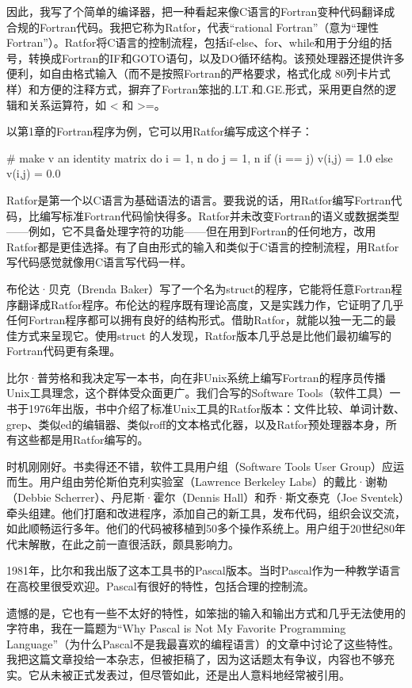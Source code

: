 \documentclass[a4paper,12pt,UTF8,twoside]{ctexbook}
\begin{document}
{因此，我写了个简单的编译器，把一种看起来像C语言的Fortran变种代码翻译成合规的Fortran代码。我把它称为Ratfor，代表“rational Fortran”（意为“理性Fortran”）。Ratfor将C语言的控制流程，包括if-else、for、while和用于分组的括号，转换成Fortran的IF和GOTO语句，以及DO循环结构。该预处理器还提供许多便利，如自由格式输入（而不是按照Fortran的严格要求，格式化成 80列卡片式样）和方便的注释方式，摒弃了Fortran笨拙的.LT.和.GE.形式，采用更自然的逻辑和关系运算符，如 < 和 >=。

以第1章的Fortran程序为例，它可以用Ratfor编写成这个样子：

# make v an identity matrix do i = 1, n do j = 1, n if (i == j) v(i,j) = 1.0 else v(i,j) = 0.0

Ratfor是第一个以C语言为基础语法的语言。要我说的话，用Ratfor编写Fortran代码，比编写标准Fortran代码愉快得多。Ratfor并未改变Fortran的语义或数据类型——例如，它不具备处理字符的功能——但在用到Fortran的任何地方，改用Ratfor都是更佳选择。有了自由形式的输入和类似于C语言的控制流程，用Ratfor写代码感觉就像用C语言写代码一样。

布伦达·贝克（Brenda Baker）写了一个名为struct的程序，它能将任意Fortran程序翻译成Ratfor程序。布伦达的程序既有理论高度，又是实践力作，它证明了几乎任何Fortran程序都可以拥有良好的结构形式。借助Ratfor，就能以独一无二的最佳方式来呈现它。使用struct 的人发现，Ratfor版本几乎总是比他们最初编写的Fortran代码更有条理。

比尔·普劳格和我决定写一本书，向在非Unix系统上编写Fortran的程序员传播Unix工具理念，这个群体受众面更广。我们合写的Software Tools（软件工具）一书于1976年出版，书中介绍了标准Unix工具的Ratfor版本：文件比较、单词计数、grep、类似ed的编辑器、类似roff的文本格式化器，以及Ratfor预处理器本身，所有这些都是用Ratfor编写的。

时机刚刚好。书卖得还不错，软件工具用户组（Software Tools User Group）应运而生。用户组由劳伦斯伯克利实验室（Lawrence Berkeley Labs）的戴比·谢勒（Debbie Scherrer）、丹尼斯·霍尔（Dennis Hall）和乔·斯文泰克（Joe Sventek）牵头组建。他们打磨和改进程序，添加自己的新工具，发布代码，组织会议交流，如此顺畅运行多年。他们的代码被移植到50多个操作系统上。用户组于20世纪80年代末解散，在此之前一直很活跃，颇具影响力。

1981年，比尔和我出版了这本工具书的Pascal版本。当时Pascal作为一种教学语言在高校里很受欢迎。Pascal有很好的特性，包括合理的控制流。

遗憾的是，它也有一些不太好的特性，如笨拙的输入和输出方式和几乎无法使用的字符串，我在一篇题为“Why Pascal is Not My Favorite Programming Language”（为什么Pascal不是我最喜欢的编程语言）的文章中讨论了这些特性。我把这篇文章投给一本杂志，但被拒稿了，因为这话题太有争议，内容也不够充实。它从未被正式发表过，但尽管如此，还是出人意料地经常被引用。

}
\end{document}
